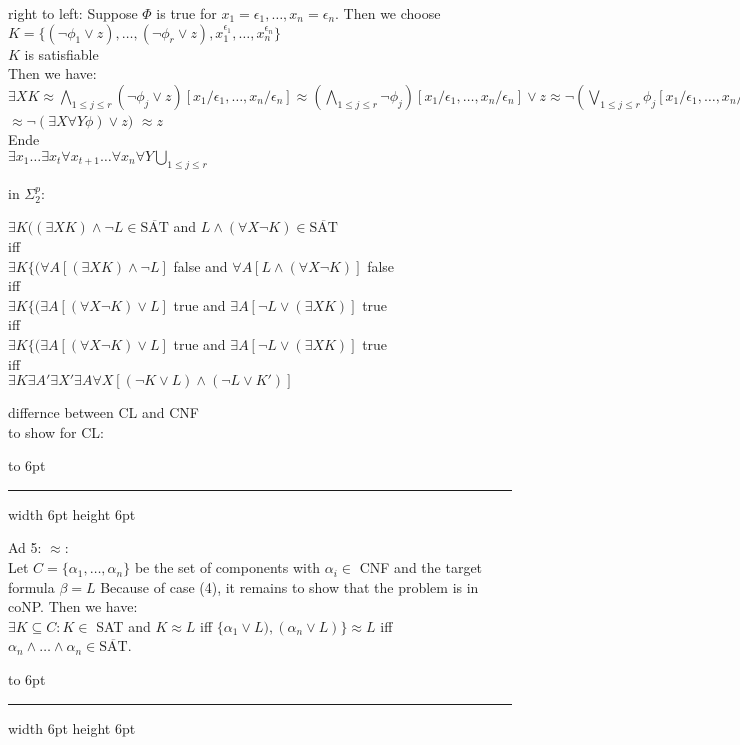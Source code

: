\documentclass[12pt]{article}
\newenvironment{proof}{\parindent=0pt{\bf Proof: }}{
   \hspace*{\fill}\hbox to 6pt{\leaders\hrule width 6pt height 6pt\hfill}\par}
\begin{document}
\begin{proof}
right to left:
Suppose $\Phi$ is true for $x_1= \epsilon_1, \ldots, x_n= \epsilon_n$. Then we choose
$K=\{ (\neg \phi_1 \vee z), \ldots, (\neg \phi_r \vee z), x_1^{\epsilon_1}, \ldots, x_n^{\epsilon_n}\}$\\
$K$ is satisfiable\\
Then we have:
$\exists X K \approx \bigwedge_{1 \leq j \leq r} (\neg \phi_j \vee z)[x_1/\epsilon_1, \ldots, x_n/\epsilon_n]
\approx (\bigwedge_{1 \leq j \leq r} \neg \phi_j)[x_1/\epsilon_1, \ldots, x_n/\epsilon_n] \vee z
\approx  \neg (\bigvee_{1 \leq j \leq r} \phi_j[x_1/\epsilon_1, \ldots, x_n/\epsilon_n]) \vee z$\\
$\approx \neg (\exists X \forall Y \phi) \vee z)$ $\approx z$\\

Ende\\


$\exists x_1 \ldots \exists x_t \forall x_{t+1} \ldots \forall x_n \forall Y \bigcup_{1 \leq j \leq r} $







in $\Sigma^p_2$:

\begin{center}
$\exists K ((\exists X K) \wedge \neg L \in \overline{\mbox{SAT}}$ and
$L \wedge (\forall X \neg K) \in \overline{\mbox{SAT}}$\\
iff\\
$\exists K \{(\forall A [(\exists X K) \wedge \neg L]$ false and
$\forall A [L \wedge (\forall X \neg K)]$ false\\
iff\\
$\exists K \{(\exists A [(\forall X \neg K) \vee  L]$ true and
$\exists A [\neg L \vee (\exists X K)]$ true\\
iff\\
$\exists K \{(\exists A [(\forall X \neg K) \vee  L]$ true and
$\exists A [\neg L \vee (\exists X K)]$ true\\
iff\\
$\exists K \exists A' \exists X' \exists A \forall X [(\neg K \vee L) \wedge (\neg L \vee K')]$
\end{center}

differnce between CL and CNF\\
to show for CL:
\end{proof}


\begin{proof}
Ad 5: $\approx$:\\
Let $C=\{\alpha_1, \ldots, \alpha_n\}$ be the set of components with $\alpha_i \in$ CNF and the target formula $\beta=L$
Because of case (4), it remains to show that the problem is in coNP. Then we have:\\
$\exists K \subseteq C: K \in$ SAT and $K \approx L$ iff $\{\alpha_1 \vee L), (\alpha_n \vee L)\} \approx L$
iff $\alpha_n \wedge \ldots \wedge \alpha_n \in \overline{\mbox{SAT}}$.
\end{proof}
\end{document}
